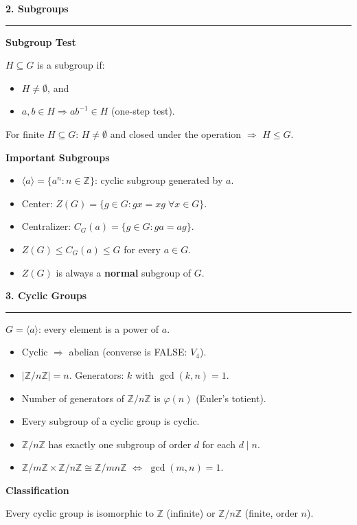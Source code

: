\documentclass[10pt,twocolumn]{article}
\newcommand{\sect}[1]{\medskip\noindent\textbf{\large #1}\medskip\hrule\smallskip}
\newcommand{\subsect}[1]{\smallskip\noindent\textbf{#1}\par}
\begin{document}
\sect{2. Subgroups}

\subsect{Subgroup Test}
$H\subseteq G$ is a subgroup if:
\begin{itemize}[nosep,leftmargin=*]
\item $H\neq\emptyset$, and
\item $a,b\in H \Rightarrow ab^{-1}\in H$ \quad (one-step test).
\end{itemize}
For finite $H\subseteq G$: $H\neq\emptyset$ and closed under the operation $\Rightarrow$ $H\le G$.

\subsect{Important Subgroups}
\begin{itemize}[nosep,leftmargin=*]
\item $\langle a\rangle = \{a^n : n\in\mathbb{Z}\}$: cyclic subgroup generated by $a$.
\item Center: $Z(G) = \{g\in G : gx=xg\;\forall x\in G\}$.
\item Centralizer: $C_G(a)=\{g\in G: ga=ag\}$.
\item $Z(G)\le C_G(a)\le G$ for every $a\in G$.
\item $Z(G)$ is always a \textbf{normal} subgroup of $G$.
\end{itemize}

\sect{3. Cyclic Groups}

$G=\langle a\rangle$: every element is a power of $a$.
\begin{itemize}[nosep,leftmargin=*]
\item Cyclic $\Rightarrow$ abelian (converse is FALSE: $V_4$).
\item $|\mathbb{Z}/n\mathbb{Z}|=n$. Generators: $k$ with $\gcd(k,n)=1$.
\item Number of generators of $\mathbb{Z}/n\mathbb{Z}$ is $\varphi(n)$ (Euler's totient).
\item Every subgroup of a cyclic group is cyclic.
\item $\mathbb{Z}/n\mathbb{Z}$ has exactly one subgroup of order $d$ for each $d\mid n$.
\item $\mathbb{Z}/m\mathbb{Z}\times\mathbb{Z}/n\mathbb{Z}\cong\mathbb{Z}/mn\mathbb{Z}$ $\iff$ $\gcd(m,n)=1$.
\end{itemize}

\subsect{Classification}
Every cyclic group is isomorphic to $\mathbb{Z}$ (infinite) or $\mathbb{Z}/n\mathbb{Z}$ (finite, order $n$).
\end{document}
